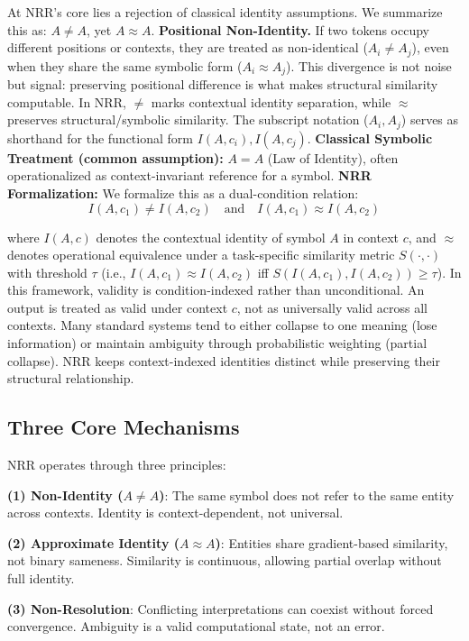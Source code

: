 \documentclass[11pt,a4paper]{article}
\begin{document}
At NRR's core lies a rejection of classical identity assumptions.
We summarize this as: $A \neq A$, yet $A \approx A$.
\textbf{Positional Non-Identity.}
If two tokens occupy different positions or contexts, they are treated as non-identical
($A_i \neq A_j$), even when they share the same symbolic form ($A_i \approx A_j$).
This divergence is not noise but signal: preserving positional difference is what makes structural similarity computable.
In NRR, $\neq$ marks contextual identity separation, while $\approx$ preserves structural/symbolic similarity.
The subscript notation ($A_i, A_j$) serves as shorthand for the functional form $I(A, c_i), I(A, c_j)$.
\textbf{Classical Symbolic Treatment (common assumption):} $A = A$ (Law of Identity), often operationalized as context-invariant reference for a symbol.
\textbf{NRR Formalization:}
We formalize this as a dual-condition relation:
\begin{equation}
I(A, c_1) \neq I(A, c_2) \quad \text{and} \quad I(A, c_1) \approx I(A, c_2)
\end{equation}

where $I(A, c)$ denotes the contextual identity of symbol $A$ in context $c$, and $\approx$ denotes operational equivalence under a task-specific similarity metric $S(\cdot,\cdot)$ with threshold $\tau$ (i.e., $I(A, c_1) \approx I(A, c_2)$ iff $S(I(A, c_1), I(A, c_2)) \ge \tau$).
In this framework, validity is condition-indexed rather than unconditional.
An output is treated as valid under context $c$, not as universally valid across all contexts.
Many standard systems tend to either collapse to one meaning (lose information) or maintain ambiguity through probabilistic weighting (partial collapse).
NRR keeps context-indexed identities distinct while preserving their structural relationship.

\subsection{Three Core Mechanisms}

NRR operates through three principles:

\textbf{(1) Non-Identity ($A \neq A$)}: The same symbol does not refer to the same entity across contexts.
Identity is context-dependent, not universal.

\textbf{(2) Approximate Identity ($A \approx A$)}: Entities share gradient-based similarity, not binary sameness.
Similarity is continuous, allowing partial overlap without full identity.

\textbf{(3) Non-Resolution}: Conflicting interpretations can coexist without forced convergence.
Ambiguity is a valid computational state, not an error.
\end{document}
